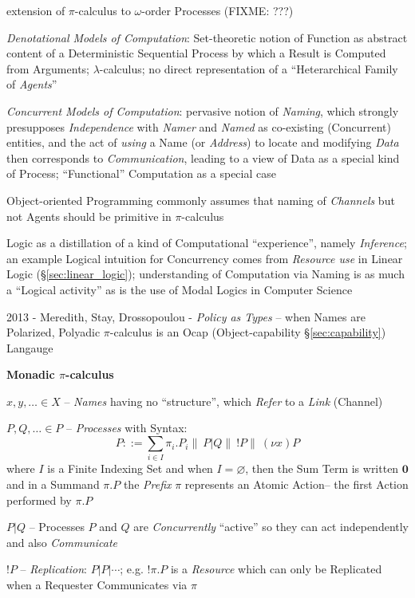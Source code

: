extension of $\pi$-calculus to $\omega$-order Processes (FIXME: ???)

\emph{Denotational Models of Computation}: Set-theoretic notion of Function as
abstract content of a Deterministic Sequential Process by which a Result is
Computed from Arguments; $\lambda$-calculus; no direct representation of a
``Heterarchical Family of \emph{Agents}''

\emph{Concurrent Models of Computation}: pervasive notion of \emph{Naming},
which strongly presupposes \emph{Independence} with \emph{Namer} and
\emph{Named} as co-existing (Concurrent) entities, and the act of \emph{using} a
Name (or \emph{Address}) to locate and modifying \emph{Data} then corresponds to
\emph{Communication}, leading to a view of Data as a special kind of Process;
``Functional'' Computation as a special case

Object-oriented Programming commonly assumes that naming of \emph{Channels} but
not Agents should be primitive in $\pi$-calculus

Logic as a distillation of a kind of Computational ``experience'', namely
\emph{Inference}; an example Logical intuition for Concurrency comes from
\emph{Resource use} in Linear Logic (\S\ref{sec:linear_logic}); understanding of
Computation via Naming is as much a ``Logical activity'' as is the use of Modal
Logics in Computer Science

2013 - Meredith, Stay, Drossopoulou - \emph{Policy as Types} -- when Names are
Polarized, Polyadic $\pi$-calculus is an Ocap (Object-capability
\S\ref{sec:capability}) Langauge

\textbf{Monadic $\pi$-calculus}

$x,y,\ldots \in X$ -- \emph{Names} having no ``structure'', which \emph{Refer}
to a \emph{Link} (Channel)

$P,Q,\ldots \in P$ -- \emph{Processes} with Syntax:
\[
  P ::= \sum_{i\in{I}}\pi_i.P_i \|\ P|Q \|\ !P \|\ (\nu{x})P
\]
where $I$ is a Finite Indexing Set and when $I = \varnothing$, then the Sum Term
is written $\mathbf{0}$ and in a Summand $\pi.P$ the \emph{Prefix} $\pi$
represents an Atomic Action-- the first Action performed by $\pi.P$

$P|Q$ -- Processes $P$ and $Q$ are \emph{Concurrently} ``active'' so they can
act independently and also \emph{Communicate}

$!P$ -- \emph{Replication}: $P|P|\cdots$; e.g. $!\pi.P$ is a \emph{Resource}
which can only be Replicated when a Requester Communicates via $\pi$


